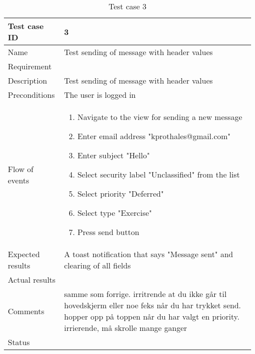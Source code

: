 \begin{table}
\begin{tabular}{l|p{10cm}}
Test case ID & 3 \\ \hline
Name & Test sending of message with header values\\ \hline
Requirement & \\ \hline
Description & Test sending of message with header values\\ \hline
Preconditions & The user is logged in\\ \hline
Flow of events & 
\begin{enumerate}
\item{}Navigate to the view for sending a new message
\item{}Enter email address "kprothales@gmail.com"
\item{}Enter subject "Hello"
\item{}Select security label "Unclassified" from the list
\item{}Select priority "Deferred"
\item{}Select type "Exercise"
\item{}Press send button
\end{enumerate} \\ \hline
Expected results & A toast notification that says "Message sent" and clearing of all fields\\ \hline \hline
Actual results & \\ \hline
Comments & samme som forrige. irritrende at du ikke går til hovedskjerm eller noe feks når du har trykket send. hopper opp på toppen når du har valgt en priority. irrierende, må skrolle mange ganger\\ \hline
Status & 
\end{tabular}
\caption{Test case 3} \label{tab:case3}
\end{table}

